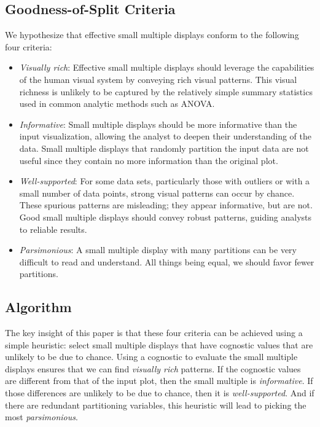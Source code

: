 \subsection{Goodness-of-Split Criteria}
We hypothesize that effective small multiple displays conform to the following four criteria:
\begin{itemize}
\item \emph{Visually rich}: Effective small multiple displays should leverage the capabilities of the human visual system by conveying rich visual patterns. This visual richness is unlikely to be captured by the relatively simple summary statistics used in common analytic methods such as ANOVA.

\item \emph{Informative}: Small multiple displays should be more informative than the input visualization, allowing the analyst to deepen their understanding of the data. Small multiple displays that randomly partition the input data are not useful since they contain no more information than the original plot.

\item \emph{Well-supported}: For some data sets, particularly those with outliers or with a small number of data points, strong visual patterns can occur by chance. These spurious patterns are misleading; they appear informative, but are not. Good small multiple displays should convey robust patterns, guiding analysts to reliable results.

\item \emph{Parsimonious}: A small multiple display with many partitions can be very difficult to read and understand. All things being equal, we should favor fewer partitions.
\end{itemize}

\subsection{Algorithm}

The key insight of this paper is that these four criteria can be achieved using a simple heuristic: select small multiple displays that have cognostic values that are unlikely to be due to chance. Using a cognostic to evaluate the small multiple displays ensures that we can find \emph{visually rich} patterns. If the cognostic values are different from that of the input plot, then the small multiple is \emph{informative}. If those differences are unlikely to be due to chance, then it is \emph{well-supported}. And if there are redundant partitioning variables, this heuristic will lead to picking the most \emph{parsimonious}. 


